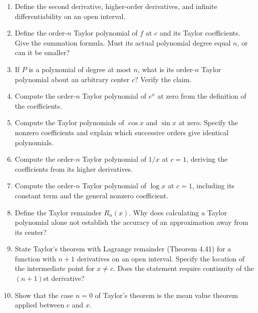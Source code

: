 \begin{enumerate}[resume]
  \item Define the second derivative, higher-order derivatives,
    and infinite differentiability on an open interval.

  \item Define the order-\(n\) Taylor polynomial of \(f\) at \(c\)
    and its Taylor coefficients. Give the summation formula.
    Must its actual polynomial degree equal \(n\), or can it be smaller?

  \item If \(P\) is a polynomial of degree at most \(n\), what
    is its order-\(n\) Taylor polynomial about an arbitrary center
    \(c\)? Verify the claim.

  \item Compute the order-\(n\) Taylor polynomial of \(e^x\)
    at zero from the definition of the coefficients.

  \item Compute the Taylor polynomials of \(\cos x\) and \(\sin x\)
    at zero. Specify the nonzero coefficients and explain which
    successive orders give identical polynomials.

  \item Compute the order-\(n\) Taylor polynomial of \(1/x\) at
    \(c=1\), deriving the coefficients from its higher derivatives.

  \item Compute the order-\(n\) Taylor polynomial of \(\log x\)
    at \(c=1\), including its constant term and the general nonzero
    coefficient.

  \item Define the Taylor remainder \(R_n(x)\).
    Why does calculating a Taylor polynomial alone not establish
    the accuracy of an approximation away from its center?

  \item State Taylor's theorem with Lagrange remainder
    (Theorem 4.41) for a function with \(n+1\) derivatives on an
    open interval. Specify the location of the intermediate point
    for \(x\ne c\). Does the statement require continuity of
    the \((n+1)\)st derivative?

  \item Show that the case \(n=0\) of Taylor's theorem is the mean
    value theorem applied between \(c\) and \(x\).


\end{enumerate}
